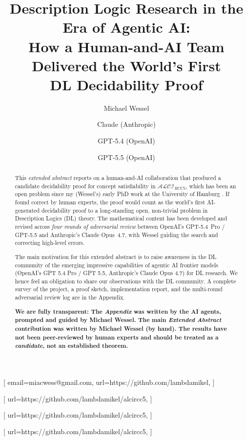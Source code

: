\documentclass[
]{ceurart}
\theoremstyle{definition}
\newcommand{\ALCIRCC}[1]{\ensuremath{\mathcal{ALCI}_{\mathit{RCC#1}}}}
\begin{document}

\conference{}

\title{Description Logic Research in the Era of Agentic AI:\\
  How a Human-and-AI Team Delivered the World's First\\
  DL Decidability Proof}

\author[1]{Michael Wessel}[%
email=miacwess@gmail.com,
url=https://github.com/lambdamikel,
]
\cormark[1]
\address[1]{University of Hamburg (doctoral work, 2002/2003)}

\author[2]{Claude (Anthropic)}[%
url=https://github.com/lambdamikel/alcircc5,
]
\address[2]{Anthropic, San Francisco, CA, USA}

\author[3]{GPT-5.4 (OpenAI)}[%
url=https://github.com/lambdamikel/alcircc5,
]
\address[3]{OpenAI, San Francisco, CA, USA}

\author[4]{GPT-5.5 (OpenAI)}[%
url=https://github.com/lambdamikel/alcircc5,
]
\address[4]{OpenAI, San Francisco, CA, USA}


\begin{abstract}
This \emph{extended abstract} reports on a human-and-AI collaboration
that produced a candidate decidability proof for concept
satisfiability in $\ALCIRCC{5}$, which has been an open problem since
my (Wessel's) early PhD work at the University of Hamburg
\cite{Wessel2002, Wessel2003}. If found correct by human experts, the
proof would count as the world's first AI-generated decidability proof
to a long-standing open, non-trivial problem in Description Logics
(DL) theory. The mathematical content has been developed and revised
across \emph{four rounds of adversarial review} between OpenAI's
GPT-5.4~Pro / GPT-5.5 and Anthropic's Claude Opus~4.7, with Wessel
guiding the search and correcting high-level errors.

The main motivation for this extended abstract is to raise awareness
in the DL community of the emerging impressive capabilities of
agentic AI frontier models (OpenAI's GPT 5.4 Pro / GPT 5.5,
Anthropic's Claude Opus 4.7) for DL research. We hence feel an
obligation to share our observations with the DL community. A
complete survey of the project, a proof sketch, implementation report,
and the multi-round adversarial review log are in the Appendix.

\textbf{We are fully transparent: The \emph{Appendix} was written by
the AI agents, prompted and guided by Michael Wessel.  The main
\emph{Extended Abstract} contribution was written by Michael Wessel
(by hand). The results have not been peer-reviewed by human experts
and should be treated as a \emph{candidate}, not an established
theorem.}
\end{abstract}
\end{document}
